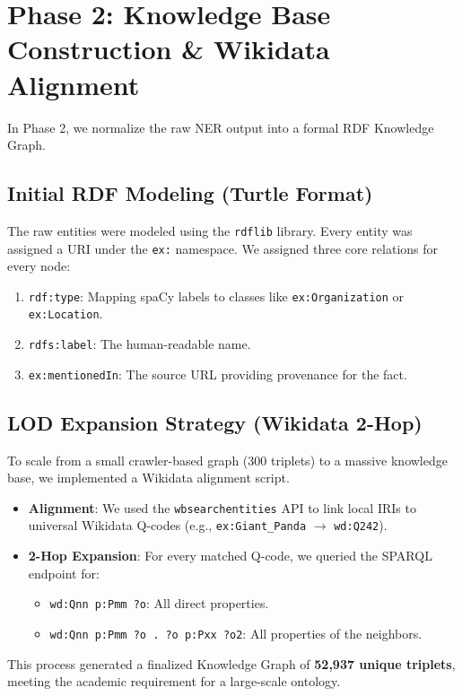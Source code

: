\documentclass[11pt]{article}
\begin{document}
\section{Phase 2: Knowledge Base Construction \& Wikidata Alignment}
In Phase 2, we normalize the raw NER output into a formal RDF Knowledge Graph.

\subsection{Initial RDF Modeling (Turtle Format)}
The raw entities were modeled using the \texttt{rdflib} library. Every entity was assigned a URI under the \texttt{ex:} namespace. We assigned three core relations for every node:
\begin{enumerate}
    \item \texttt{rdf:type}: Mapping spaCy labels to classes like \texttt{ex:Organization} or \texttt{ex:Location}.
    \item \texttt{rdfs:label}: The human-readable name.
    \item \texttt{ex:mentionedIn}: The source URL providing provenance for the fact.
\end{enumerate}

\subsection{LOD Expansion Strategy (Wikidata 2-Hop)}
To scale from a small crawler-based graph (300 triplets) to a massive knowledge base, we implemented a Wikidata alignment script. 
\begin{itemize}
    \item \textbf{Alignment}: We used the \texttt{wbsearchentities} API to link local IRIs to universal Wikidata Q-codes (e.g., \texttt{ex:Giant_Panda} $\rightarrow$ \texttt{wd:Q242}).
    \item \textbf{2-Hop Expansion}: For every matched Q-code, we queried the SPARQL endpoint for:
    \begin{itemize}
        \item \texttt{wd:Qnn p:Pmm ?o}: All direct properties.
        \item \texttt{wd:Qnn p:Pmm ?o . ?o p:Pxx ?o2}: All properties of the neighbors.
    \end{itemize}
\end{itemize}
This process generated a finalized Knowledge Graph of \textbf{52,937 unique triplets}, meeting the academic requirement for a large-scale ontology.
\end{document}
